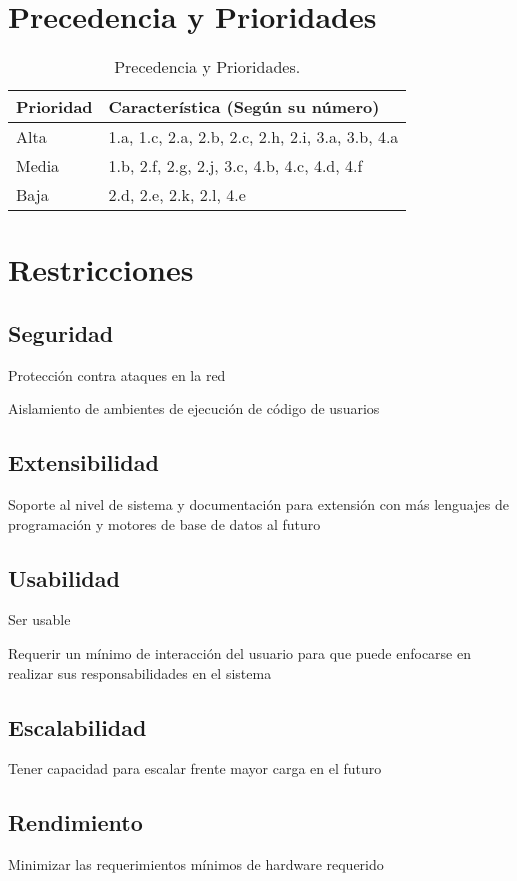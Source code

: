 \pagebreak

\section{Precedencia y Prioridades}
\begin{table}[h!]
  \begin{tabular}{|p{}|p{}|}
    \hline
    \textbf{Prioridad} & \textbf{Característica (Según su número)} \\
    \hline
    Alta & 1.a, 1.c, 2.a, 2.b, 2.c, 2.h, 2.i, 3.a, 3.b, 4.a \\
    \hline
    Media & 1.b, 2.f, 2.g, 2.j, 3.c, 4.b, 4.c, 4.d, 4.f \\
    \hline
    Baja & 2.d, 2.e, 2.k, 2.l, 4.e \\
    \hline
  \end{tabular}
  \caption{Precedencia y Prioridades.}
  \label{precedencia-y-prioridades}
\end{table}

\section{Restricciones}
\subsection{Seguridad}
Protección contra ataques en la red

Aislamiento de ambientes de ejecución de código de usuarios
\subsection{Extensibilidad}
Soporte al nivel de sistema y documentación para extensión con más lenguajes de programación y motores de base de datos al futuro
\subsection{Usabilidad}
Ser usable

Requerir un mínimo de interacción del usuario para que puede enfocarse en realizar sus responsabilidades en el sistema
\subsection{Escalabilidad}
Tener capacidad para escalar frente mayor carga en el futuro
\subsection{Rendimiento}
Minimizar las requerimientos mínimos de hardware requerido
